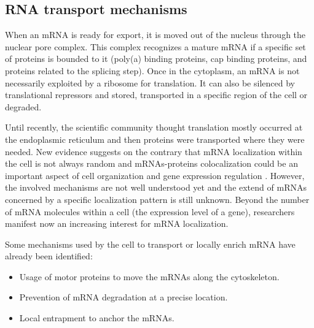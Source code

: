 \subsection{RNA transport mechanisms}
\label{subsec:intro_rna_transport}

When an \ac{mRNA} is ready for export, it is moved out of the nucleus through the nuclear pore complex.
This complex recognizes a mature \ac{mRNA} if a specific set of proteins is bounded to it (poly(a) binding proteins, cap binding proteins, and proteins related to the splicing step).
Once in the cytoplasm, an \ac{mRNA} is not necessarily exploited by a ribosome for translation.
It can also be silenced by translational repressors and stored, transported in a specific region of the cell or degraded.

Until recently, the scientific community thought translation mostly occurred at the endoplasmic reticulum and then proteins were transported where they were needed.
New evidence suggests on the contrary that \ac{mRNA} localization within the cell is not always random and \ac{mRNA}s-proteins colocalization could be an important aspect of cell organization and gene expression regulation \cite{Lecuyer2007}.
However, the involved mechanisms are not well understood yet and the extend of \ac{mRNA}s concerned by a specific localization pattern is still unknown.
Beyond the number of \ac{mRNA} molecules within a cell (the expression level of a gene), researchers manifest now an increasing interest for \ac{mRNA} localization.

\noindent
Some mechanisms used by the cell to transport or locally enrich \ac{mRNA} have already been identified:
\begin{itemize}
	\item Usage of motor proteins to move the \ac{mRNA}s along the cytoskeleton.
	\item Prevention of \ac{mRNA} degradation at a precise location.
	\item Local entrapment to anchor the \ac{mRNA}s.
\end{itemize}



